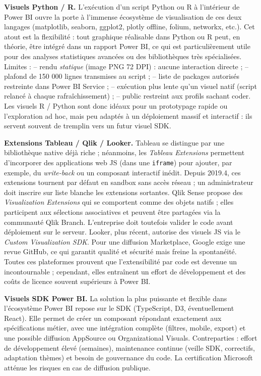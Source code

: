 \medskip
\textbf{Visuels Python / R.}  
L’exécution d’un script Python ou R à l’intérieur de Power BI ouvre la
porte à l’immense écosystème de visualisation de ces deux langages
(matplotlib, seaborn, ggplot2, plotly offline, folium, networkx, etc.). Cet
atout est la flexibilité : tout graphique réalisable dans Python ou R peut,
en théorie, être intégré dans un rapport Power BI, ce qui est particulièrement
utile pour des analyses statistiques avancées ou des bibliothèques très
spécialisées.  
Limites :  
– rendu \emph{statique} (image PNG 72 DPI) : aucune interaction directe ;  
– plafond de 150 000 lignes transmises au script ;  
– liste de packages autorisés restreinte dans Power BI Service ;  
– exécution plus lente qu’un visuel natif (script relancé à chaque
rafraîchissement) ;  
– public restreint aux profils sachant coder.  
Les visuels R / Python sont donc idéaux pour un prototypage rapide ou
l’exploration ad hoc, mais peu adaptés à un déploiement massif et
interactif : ils servent souvent de tremplin vers un futur visuel SDK.

\medskip
\textbf{Extensions Tableau / Qlik / Looker.}  
Tableau se distingue par une bibliothèque native déjà riche ; néanmoins,
les \emph{Tableau Extensions} permettent d’incorporer des applications
web JS (dans une \texttt{iframe}) pour ajouter, par exemple, du
\emph{write-back} ou un composant interactif inédit. Depuis 2019.4, ces
extensions tournent par défaut en sandbox sans accès réseau ; un
administrateur doit inscrire sur liste blanche les extensions sortantes.  
Qlik Sense propose des \emph{Visualization Extensions} qui se comportent
comme des objets natifs ; elles participent aux sélections associatives et
peuvent être partagées via la communauté Qlik Branch. L’entreprise doit
toutefois valider le code avant déploiement sur le serveur.  
Looker, plus récent, autorise des visuels JS via le \emph{Custom
Visualization SDK}. Pour une diffusion Marketplace, Google exige une revue
GitHub, ce qui garantit qualité et sécurité mais freine la spontanéité.  
Toutes ces plateformes prouvent que l’extensibilité par code est devenue un
incontournable ; cependant, elles entraînent un effort de développement et
des coûts de licence souvent supérieurs à Power BI.

\medskip
\textbf{Visuels SDK Power BI.}  
La solution la plus puissante et flexible dans l’écosystème Power BI repose
sur le SDK (TypeScript, D3, éventuellement React). Elle permet de créer un
composant répondant exactement aux spécifications métier, avec une
intégration complète (filtres, mobile, export) et une possible diffusion
AppSource ou Organizational Visuals. Contreparties : effort de
développement élevé (semaines), maintenance continue (veille SDK,
correctifs, adaptation thèmes) et besoin de gouvernance du code. La
certification Microsoft atténue les risques en cas de diffusion publique.

